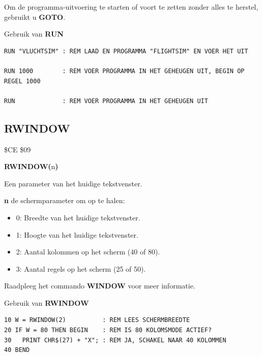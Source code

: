 \begin{description}[leftmargin=2cm,style=nextline]
                  Om de programma-uitvoering te starten of voort te zetten zonder alles te herstel, gebruikt u {\bf GOTO}.

\item [Voorbeelden:] Gebruik van {\bf RUN}

\begin{tcolorbox}[colback=black,coltext=white]
\verbatimfont{\codefont}
\begin{verbatim}
RUN "VLUCHTSIM" : REM LAAD EN PROGRAMMA "FLIGHTSIM" EN VOER HET UIT

RUN 1000        : REM VOER PROGRAMMA IN HET GEHEUGEN UIT, BEGIN OP REGEL 1000

RUN             : REM VOER PROGRAMMA IN HET GEHEUGEN UIT
\end{verbatim}
\end{tcolorbox}
\end{description}


\newpage
\subsection{RWINDOW}
\begin{description}[leftmargin=2cm,style=nextline]
\item [Token:]    \$CE \$09

\item [Formaat:]   {\bf RWINDOW(}n{\bf)}

\item [Retourneert:]  Een parameter van het huidige tekstvenster.

                  {\bf n} de schermparameter om op te halen:

                  \begin{itemize}
                     \item 0: Breedte van het huidige tekstvenster.                     \item 1: Hoogte van het huidige tekstvenster.                     \item 2: Aantal kolommen op het scherm (40 of 80).                     \item 3: Aantal regels op het scherm (25 of 50).
                  \end{itemize}

\item [Opmerkingen:]  Raadpleeg het commando {\bf WINDOW} voor meer informatie.

\item [Voorbeeld:]  Gebruik van {\bf RWINDOW}

\begin{tcolorbox}[colback=black,coltext=white]
\verbatimfont{\codefont}
\begin{verbatim}
10 W = RWINDOW(2)          : REM LEES SCHERMBREEDTE
20 IF W = 80 THEN BEGIN    : REM IS 80 KOLOMSMODE ACTIEF?
30   PRINT CHR$(27) + "X"; : REM JA, SCHAKEL NAAR 40 KOLOMMEN
40 BEND
\end{verbatim}
\end{tcolorbox}
\end{description}

